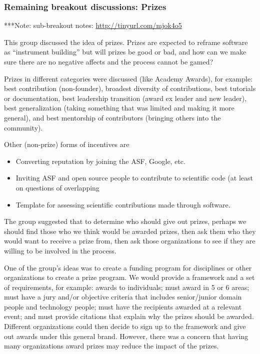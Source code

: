 \documentclass[11pt, oneside]{amsart}
\newcommand{\note}[1]{ {\textcolor{blueish}    { ***Note:      #1 }}}
\begin{document}
\subsubsection{Remaining breakout discussions: Prizes}\label{sec:prizes}
\note{sub-breakout notes: \url{http://tinyurl.com/mjok4o5}}

This group discussed the idea of prizes. Prizes are expected to reframe software
as ``instrument building'' but will prizes be good or bad, and how can we make
sure there are no negative affects and the process cannot be gamed?

Prizes in different categories were discussed (like Academy Awards), for
example: best contribution (non-founder), broadest diversity of contributions,
best tutorials or documentation, best leadership transition (award ex leader and
new leader), best generalization (taking something that was limited and making
it more general), and best mentorship of contributors (bringing others into the
community).

Other (non-prize) forms of incentives are
\begin{itemize}
\item Converting reputation by joining the ASF, Google, etc.
\item Inviting ASF and open source people to contribute to scientific code (at
least on questions of overlapping
\item Template for assessing scientific contributions made through software.
\end{itemize}

The group suggested that to determine who should give out prizes, perhaps we
should find those who we think would be awarded prizes, then ask them who they
would want to receive a prize from, then ask those organizations to see if they
are willing to be involved in the process.

One of the group's ideas was to create a funding program for disciplines or
other organizations to create a prize program. We would provide a framework and
a set of requirements, for example: awards to individuals; must award in 5 or 6
areas; must have a jury and/or objective criteria that includes senior/junior
domain people and technology people; must have the recipients awarded at a
relevant event; and must provide citations that explain why the prizes should be
awarded. Different organizations could then decide to sign up to the framework
and give out awards under this general brand. However, there was a concern that
having many organizations award prizes may reduce the impact of the prizes.
\end{document}
